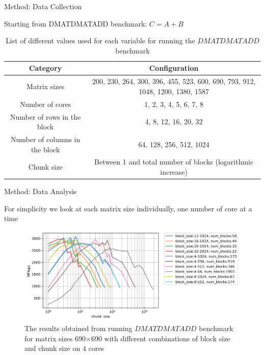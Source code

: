 \documentclass[10pt]{beamer}
\begin{document}
\begin{frame}{Method: Data Collection}
	\begin{outline}
		\1Starting from DMATDMATADD benchmark: $C=A+B$
	\begin{table}[H]
		\centering
		\resizebox{0.8\textwidth}{!}
		{\begin{tabular}{|c | c |} 
				\hline
				Category & Configuration \\
				\hline
				\hline
				Matrix sizes & 200, 230, 264, 300, 396, 455, 523, 600, 690, 793, 912, 1048, 1200, 1380, 1587 \\ [0.5ex] 
				\hline
				Number of cores & 1, 2, 3, 4, 5, 6, 7, 8 \\ 	
				\hline
				Number of rows in the block & 4, 8, 12, 16, 20, 32 \\
				\hline	
				Number of columns in the block & 64, 128, 256, 512, 1024 \\
				\hline
				Chunk size & Between 1 and total number of blocks (logarithmic increase)\\\hline
		\end{tabular}}
		
		\caption{List of different values used for each variable for running the $DMATDMATADD$ benchmark}
		\label{table1}
	\end{table}
	\end{outline}
\end{frame}


\begin{frame}{Method: Data Analysis}
	\begin{outline}
		\1For simplicity we look at each matrix size individually, one number of core at a time 
		
		
		\begin{figure}
			\includegraphics[width=0.9\linewidth]{images/fig5.png}	
			\caption{The results obtained from running $DMATDMATADD$ benchmark for matrix sizes 690$\times$690 with different combinations of block size and chunk size on $4$ cores}	
		\end{figure}
	\end{outline}
\end{frame}
\end{document}
